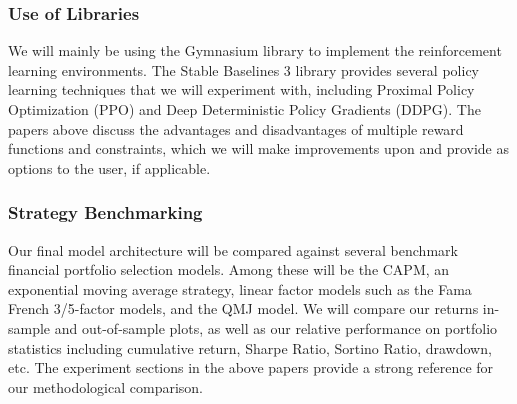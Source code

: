 \subsubsection{Use of Libraries}

We will mainly be using the Gymnasium library to implement the reinforcement learning environments. 
The Stable Baselines 3 library provides several policy learning techniques that we will experiment with, 
including Proximal Policy Optimization (PPO) and Deep Deterministic Policy Gradients (DDPG). 
The papers above discuss the advantages and disadvantages of multiple reward functions and constraints, 
which we will make improvements upon and provide as options to the user, if applicable.

\subsubsection{Strategy Benchmarking}

Our final model architecture will be compared against several benchmark financial portfolio selection 
models. Among these will be the CAPM, an exponential moving average strategy, linear factor models 
such as the Fama French 3/5-factor models, and the QMJ model. We will compare our returns 
in-sample and out-of-sample plots, as well as our relative performance on portfolio statistics 
including cumulative return, Sharpe Ratio, Sortino Ratio, drawdown, etc. The experiment sections 
in the above papers provide a strong reference for our methodological comparison.

